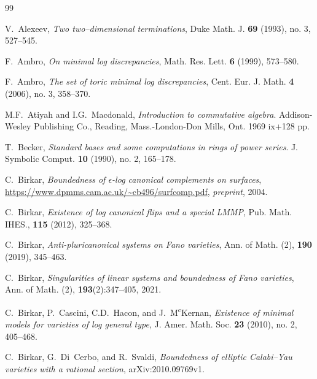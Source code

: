 \documentclass[11pt]{amsart}
\numberwithin{equation}{section}
\theoremstyle{definition}
\theoremstyle{definition}
\begin{document}
\begin{thebibliography}{99}

 V.~Alexeev, \textit{Two two--dimensional terminations}, Duke Math. J. \textbf{69} (1993), no. 3, 527--545.

 F.~Ambro, \textit{On minimal log discrepancies}, Math. Res. Lett. \textbf{6} (1999), 573–580.

 F.~Ambro, \textit{The set of toric minimal log discrepancies}, Cent. Eur. J. Math. \textbf{4} (2006), no. 3, 358--370.



M.F.~Atiyah and I.G.~Macdonald, \textit{Introduction to commutative algebra}. Addison-Wesley Publishing Co., Reading, Mass.-London-Don Mills, Ont. 1969 ix+128 pp.


 T.~Becker, \textit{Standard bases and some computations in rings of power series}. J. Symbolic Comput. \textbf{10} (1990), no. 2, 165--178.

 C.~Birkar,
\textit{Boundedness of $\epsilon$-log canonical complements on surfaces},
  \url{https://www.dpmms.cam.ac.uk/~cb496/surfcomp.pdf}, {\em preprint}, 2004.

 C.~Birkar, \textit{Existence of log canonical flips and a special LMMP}, Pub. Math. IHES., \textbf{115} (2012), 325--368.

 C.~Birkar, \textit{Anti-pluricanonical systems on Fano varieties}, Ann. of Math. (2), \textbf{190} (2019), 345--463.

C.~Birkar, \textit{Singularities of linear systems and boundedness of {F}ano varieties}, Ann. of Math. (2), \textbf{193}(2):347--405, 2021.


 C.~Birkar, P.~Cascini, C.D.~Hacon, and J.~M\textsuperscript{c}Kernan, \textit{Existence of minimal models for varieties of log general type}, J. Amer. Math. Soc. \textbf{23} (2010), no. 2, 405--468.

	 C.~Birkar, G.~Di~Cerbo, and R.~Svaldi, {\it Boundedness of elliptic Calabi--Yau varieties with a rational section}, arXiv:2010.09769v1.



\end{thebibliography}
\end{document}
